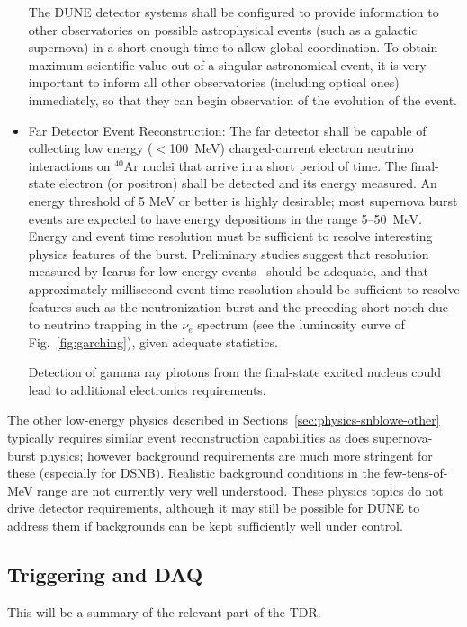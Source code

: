 \begin{itemize}
The DUNE detector systems shall be configured to provide  information to other observatories on possible astrophysical events (such as a galactic supernova) in a short enough time to allow global coordination.   
To obtain maximum scientific value out of a singular astronomical event, it is very important to inform all other observatories (including optical ones) immediately, so that they can begin observation of the evolution of the event. 

\item Far Detector Event Reconstruction:   
The far detector shall be capable of collecting low energy ($<$\SI{100}{\MeV})  charged-current electron neutrino interactions on $^{40}$Ar nuclei that arrive in a short period of time. The final-state electron (or positron) shall be detected and its energy measured.   An energy threshold of 5 MeV or better is highly desirable; most supernova burst events are expected to have energy depositions in the range 5--50~MeV.
Energy and event time resolution must be sufficient to resolve interesting physics features of the burst.  Preliminary studies suggest that resolution measured by Icarus for low-energy events~\cite{Amoruso:2003sw} should be adequate, and that approximately millisecond event time resolution should be sufficient to resolve features such as the neutronization burst and the preceding short notch due to neutrino trapping in the $\nu_e$ spectrum (see the luminosity curve of Fig.~\ref{fig:garching}), given adequate statistics.   

Detection of gamma ray photons from the final-state excited nucleus could lead to additional electronics requirements.  

\end{itemize}



The other low-energy physics described in Sections~\ref{sec:physics-snblowe-other} typically requires similar event reconstruction capabilities as does supernova-burst physics; however background requirements are much more stringent for these (especially for DSNB).  Realistic background conditions in the few-tens-of-MeV range are not currently  very well understood.  
These physics topics do not drive detector requirements, although it may still be possible for DUNE to address them if backgrounds can be kept sufficiently well under control.




\subsection{Triggering and DAQ}

This will be a summary of the relevant part of the TDR.


